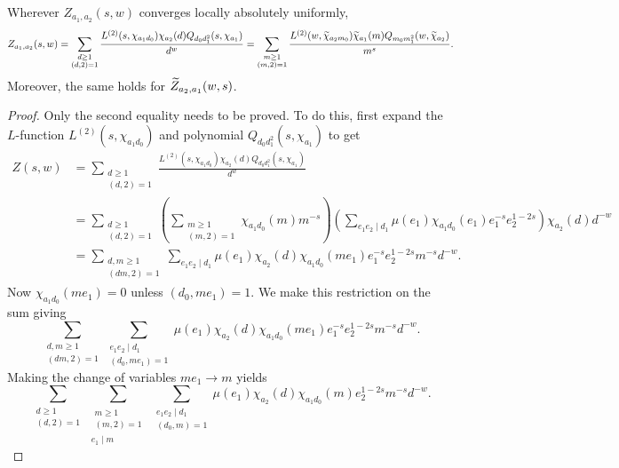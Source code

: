     \begin{theorem}[Interchange]
        Wherever $Z_{a_{1},a_{2}}(s,w)$ converges locally absolutely uniformly,
        \[
            Z_{a_{1},a_{2}}(s,w) = \sum_{\substack{d \ge 1 \\ (d,2) = 1}}\frac{L^{(2)}(s,\chi_{a_{1}d_{0}})\chi_{a_{2}}(d)Q_{d_{0}d_{1}^{2}}(s,\chi_{a_{1}})}{d^{w}} = \sum_{\substack{m \ge 1 \\ (m,2) = 1}}\frac{L^{(2)}(w,\widetilde{\chi}_{a_{2}m_{0}})\widetilde{\chi}_{a_{1}}(m)Q_{m_{0}m_{1}^{2}}(w,\widetilde{\chi}_{a_{2}})}{m^{s}}.
        \]
        Moreover, the same holds for $\widetilde{Z}_{a_{2},a_{1}}(w,s)$.
    \end{theorem}
    \begin{proof}
        Only the second equality needs to be proved. To do this, first expand the $L$-function $L^{(2)}(s,\chi_{a_{1}d_{0}})$ and polynomial $Q_{d_{0}d_{1}^{2}}(s,\chi_{a_{1}})$ to get
        \begin{align*}
            Z(s,w) &= \sum_{\substack{d \ge 1 \\ (d,2) = 1}}\frac{L^{(2)}(s,\chi_{a_{1}d_{0}})\chi_{a_{2}}(d)Q_{d_{0}d_{1}^{2}}(s,\chi_{a_{1}})}{d^{w}} \\
            &= \sum_{\substack{d \ge 1 \\ (d,2) = 1}}\left(\sum_{\substack{m \ge 1 \\ (m,2) = 1}}\chi_{a_{1}d_{0}}(m)m^{-s}\right)\left(\sum_{e_{1}e_{2} \mid d_{1}}\mu(e_{1})\chi_{a_{1}d_{0}}(e_{1})e_{1}^{-s}e_{2}^{1-2s}\right)\chi_{a_{2}}(d)d^{-w} \\
            &= \sum_{\substack{d,m \ge 1 \\ (dm,2) = 1}}\sum_{e_{1}e_{2} \mid d_{1}}\mu(e_{1})\chi_{a_{2}}(d)\chi_{a_{1}d_{0}}(me_{1})e_{1}^{-s}e_{2}^{1-2s}m^{-s}d^{-w}.
        \end{align*}
        Now $\chi_{a_{1}d_{0}}(me_{1}) = 0$ unless $(d_{0},me_{1}) = 1$. We make this restriction on the sum giving
        \[
            \sum_{\substack{d,m \ge 1 \\ (dm,2) = 1}}\sum_{\substack{e_{1}e_{2} \mid d_{1} \\ (d_{0},me_{1}) = 1}}\mu(e_{1})\chi_{a_{2}}(d)\chi_{a_{1}d_{0}}(me_{1})e_{1}^{-s}e_{2}^{1-2s}m^{-s}d^{-w}.
        \]
        Making the change of variables $me_{1} \to m$ yields
        \[
            \sum_{\substack{d \ge 1 \\ (d,2) = 1}}\sum_{\substack{\substack{m \ge 1 \\ (m,2) = 1} \\ e_{1} \mid m}}\sum_{\substack{e_{1}e_{2} \mid d_{1} \\ (d_{0},m) = 1}}\mu(e_{1})\chi_{a_{2}}(d)\chi_{a_{1}d_{0}}(m)e_{2}^{1-2s}m^{-s}d^{-w}.
\]
\end{proof}
